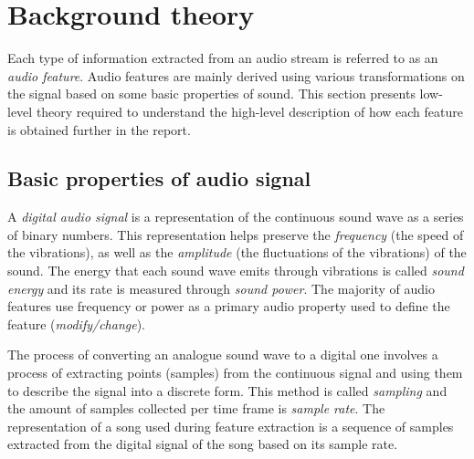 
\chapter{Background theory}
\label{chap:relatedterms}
\ifpdf
    \graphicspath{{RelatedTerminology/Figures/PNG/}{RelatedTerminology/Figures/PDF/}{RelatedTerminology/Figures/}}
\else
    \graphicspath{{RelatedTerminology/Figures/EPS/}{RelatedTerminology/Figures/}}
\fi



%

Each type of information extracted from an audio stream is referred to as an
\textit{audio feature}. Audio features are mainly derived using various 
transformations on the signal based on some basic properties of sound. This
section presents low-level theory required to understand the high-level
description of how each feature is obtained further in the report.


\section{Basic properties of audio signal}
\label{sec:audioprops}
A \textit{digital audio signal} is a representation of the continuous sound wave
as a series of binary numbers. This representation helps preserve the
\textit{frequency} (the speed of the vibrations), as well as the
\textit{amplitude} (the fluctuations of the vibrations) of the sound. The energy
that each sound wave emits through vibrations is called \textit{sound energy}
and its rate is measured through \textit{sound power}. The majority of audio
features use frequency or power as a primary audio property used to define the
feature (\textit{modify/change}). 

The process of converting an analogue sound wave to a digital one involves a
process of extracting points (samples) from the continuous signal and using them
to describe the signal into a discrete form. This method is called
\textit{sampling} and the amount of samples collected per time frame is
\textit{sample rate}. The representation of a song used during feature
extraction is a sequence of samples extracted from the digital signal of the
song based on its sample rate.

